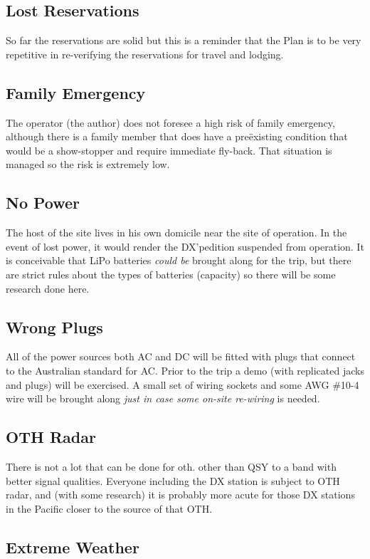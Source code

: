 \documentclass[11pt]{article}
\begin{document}
\subsection{Lost Reservations}
  So far the reservations are solid but this is a reminder that the Plan is to be very repetitive in re-verifying the reservations
for travel and lodging.

\subsection{Family Emergency}
 The operator (the author) does not foresee
a high risk of family emergency, although there is a family member
that does have a pre\"existing condition that would be a show-stopper
and require immediate fly-back.  That situation is managed so the
risk is extremely low.

\subsection{No Power}
  The host of the site lives in his own domicile near
the site of operation.  In the event of lost power, it would render
the DX'pedition suspended from operation.   It is conceivable that
LiPo batteries {\textit{could be}} brought along for the trip, but
there are strict rules about the types of batteries (capacity) so
there will be some research done here.


\subsection{Wrong Plugs}
  All of the power sources both AC and DC will be
fitted with plugs that connect to the Australian standard for AC.  Prior
to the trip a demo (with replicated jacks and plugs) will be exercised.
A small set of wiring sockets and some AWG \#10-4 wire will be brought
along {\textit{just in case some on-site re-wiring}} is needed.


\subsection{OTH Radar}
There is not a lot that can be done for {\gls{oth}}.
other than QSY to a band with better signal qualities.   Everyone
including the DX station is subject to OTH radar, and (with some 
research) it is probably more acute for those DX stations in the Pacific
closer to the source of that OTH.


\subsection{Extreme Weather}
\end{document}
